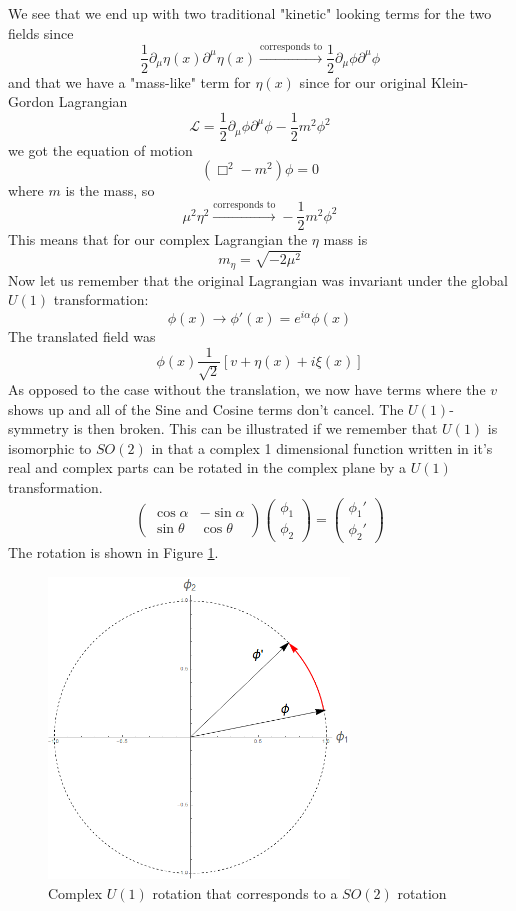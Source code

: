 \documentclass[a4,10pt,titlepage]{article}
\renewcommand\[{\begin{equation*}}
\renewcommand\]{\end{equation*}}
\newcommand{\be}{\begin{equation}}
\newcommand{\ee}{\end{equation}}
\numberwithin{equation}{section}
\newcommand{\lp}{\left}
\newcommand{\rp}{\right}
\newcommand{\Lar}{\mathscr{L}}
\newcommand{\half}{\frac{1}{2}}
\begin{document}
We see that we end up with two traditional "kinetic" looking terms for the two fields since 
\[
\half\partial_\mu\eta(x)\partial^\mu\eta(x)\xrightarrow{\text{corresponds to}}\half \partial_\mu\phi\partial^\mu\phi
\]
and that we have a "mass-like" term for $\eta(x)$ since for our original Klein-Gordon Lagrangian
\be
\Lar=\half\partial_\mu\phi\partial^\mu\phi-\half m^2\phi^2
\ee
we got the equation of motion
\be
\lp(\Box^2-m^2\rp)\phi=0
\ee
where $m$ is the mass, so
\[
\mu^2\eta^2\xrightarrow{\text{corresponds to}}-\half m^2\phi^2
\]
This means that for our complex Lagrangian the $\eta$ mass is
\[
m_\eta=\sqrt{-2\mu^2}
\]
Now let us remember that the original Lagrangian was invariant under the global $U(1)$ transformation:
\[
\phi(x)\rightarrow \phi'(x)=e^{i\alpha}\phi(x)
\]
The translated field was
\[
\phi(x)\frac{1}{\sqrt{2}}\lp[ v+\eta(x)+i\xi(x) \rp]
\]
As opposed to the case without the translation, we now have terms where the $v$ shows up and all of the Sine and Cosine terms don't cancel. The $U(1)$-symmetry is then broken. This can be illustrated if we remember that $U(1)$ is isomorphic to $SO(2)$ in that a complex 1 dimensional function written in it's real and complex parts can be rotated in the complex plane by a $U(1)$ transformation.
\[
\begin{pmatrix}
\cos{\alpha}&-\sin{\alpha}\\
\sin{\theta }&\cos{\theta}
\end{pmatrix}
\begin{pmatrix}
\phi_1\\
\phi_2
\end{pmatrix}
=\begin{pmatrix}
\phi_1'\\
\phi_2'
\end{pmatrix}
\]
The rotation is shown in Figure \ref{fig:my_label3}.
\begin{figure}[htb]
    \centering
    \includegraphics[width=8cm]{Rotation.png}
    \caption{Complex $U(1)$ rotation that corresponds to a $SO(2)$ rotation}
    \label{fig:my_label3}
\end{figure}
\end{document}
